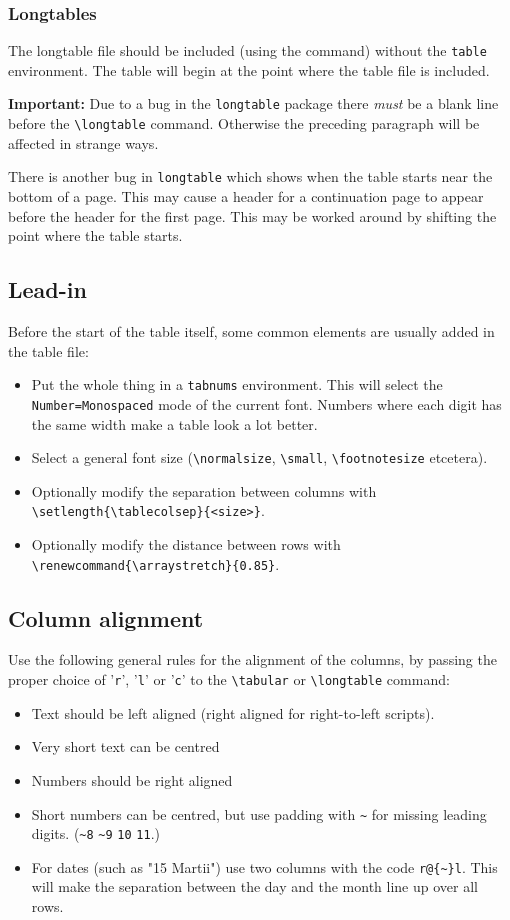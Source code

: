 \documentclass{report}
\begin{document}
\subsubsection{Longtables}
The longtable file should be included (using the \verb++ command)
 without the \verb+table+ environment.
The table will begin at the point where the table file is included.

\textbf{Important:} Due to a bug in the \verb+longtable+ package there
\emph{must} be a blank line before the \verb+\longtable+ command.
Otherwise the preceding paragraph will be affected in strange ways.

There is another bug in \verb+longtable+ which shows when the table starts
near the bottom of a page. This may cause a header for a continuation page
to appear before the header for the first page.
This may be worked around by shifting the point where the table starts.

\subsection{Lead-in}
Before the start of the table itself, some common elements are usually
added in the table file:
\begin{itemize}
\item Put the whole thing in a \verb+tabnums+ environment.
This will select the \verb+Number=Monospaced+ mode of the current font.
Numbers where each digit has the same width make a table look a lot better.
\item Select a general font size (\verb+\normalsize+, \verb+\small+,
\verb+\footnotesize+ etcetera).
\item Optionally modify the separation between columns with
\verb+\setlength{\tablecolsep}{<size>}+.
\item Optionally modify the distance between rows with
\verb+\renewcommand{\arraystretch}{0.85}+.
\end{itemize}

\subsection{Column alignment}
Use the following general rules for the alignment of the columns,
by passing the proper choice of '\verb+r+', '\verb+l+' or '\verb+c+'
 to the \verb+\tabular+ or \verb+\longtable+ command:
\begin{itemize}
\item Text should be left aligned (right aligned for right-to-left scripts).
\item Very short text can be centred
\item Numbers should be right aligned
\item Short numbers can be centred, but use padding with \verb+~+ for missing
leading digits. (\verb+~8+ \verb+~9+ \verb+10+ \verb+11+.)
\item For dates (such as "15 Martii") use two columns with the code
\verb+r@{~}l+.
This will make the separation between the day and the month line up
over all rows.
\end{itemize}
\end{document}
